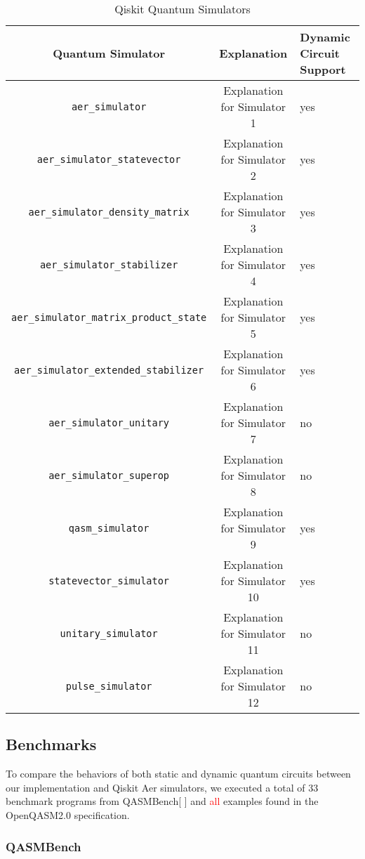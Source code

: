 \documentclass[10pt,a4paper]{article}
\newcommand{\<}{\langle}
\renewcommand{\>}{\rangle}
\newcommand{\red}[1]{\textcolor{red}{#1}}
\begin{document}
\begin{table}[h]
\centering
\begin{tabularx}{\textwidth}{|c|c|X|}
\hline
\textbf{Quantum Simulator} & \textbf{Explanation} & \textbf{Dynamic Circuit Support}\\
\hline
\texttt{aer\_simulator} & Explanation for Simulator 1 & yes \\
\hline
\texttt{aer\_simulator\_statevector} & Explanation for Simulator 2 & yes \\
\hline
\texttt{aer\_simulator\_density\_matrix} & Explanation for Simulator 3 & yes \\
\hline
\texttt{aer\_simulator\_stabilizer} & Explanation for Simulator 4 & yes \\
\hline
\texttt{aer\_simulator\_matrix\_product\_state} & Explanation for Simulator 5 & yes \\
\hline
\texttt{aer\_simulator\_extended\_stabilizer}& Explanation for Simulator 6 & yes \\
\hline
\texttt{aer\_simulator\_unitary} & Explanation for Simulator 7 & no \\
\hline
\texttt{aer\_simulator\_superop} & Explanation for Simulator 8 & no \\
\hline
\texttt{qasm\_simulator} & Explanation for Simulator 9 & yes \\
\hline
\texttt{statevector\_simulator} & Explanation for Simulator 10 & yes \\
\hline
\texttt{unitary\_simulator} & Explanation for Simulator 11 & no \\
\hline
\texttt{pulse\_simulator} & Explanation for Simulator 12 & no \\
\hline
\end{tabularx}
\caption{Qiskit Quantum Simulators}
\label{table:qsimulators}
\end{table}

\subsection{Benchmarks}

To compare the behaviors of both static and dynamic quantum circuits between our implementation and
Qiskit Aer simulators, we executed a total of 33 benchmark programs from QASMBench[ ] and \red{all} examples
found in the OpenQASM2.0 specification.

\subsubsection{QASMBench}
\end{document}
